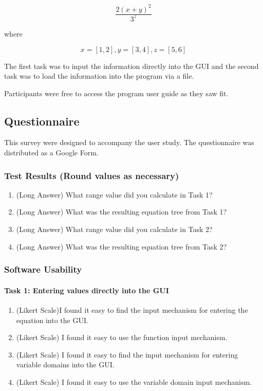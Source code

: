 \documentclass[12pt, titlepage]{article}
\begin{document}
$$\frac{2(x + y)^2}{3^z}$$

where

$$x = [1, 2], y = [3, 4], z = [5, 6]$$

The first task was to input the information directly into the GUI and the 
second task was to load the information into the program via a file.

Participants were free to access the program user guide as they saw fit. 

\subsection{Questionnaire}
This survey were designed to accompany the user study. The questionnaire was 
distributed as a Google Form.

\subsubsection{Test Results (Round values as necessary)}
\begin{enumerate}
	\item (Long Answer) What range value did you calculate in Task 1?
	\item (Long Answer) What was the resulting equation tree from Task 1?
	\item (Long Answer) What range value did you calculate in Task 2?
	\item (Long Answer) What was the resulting equation tree from Task 2?
\end{enumerate}

\subsubsection{Software Usability}
\paragraph{Task 1: Entering values directly into the GUI}
\begin{enumerate}
	\item (Likert Scale)I found it easy to find the input mechanism for 
	entering 
	the equation into the GUI.
	
	\item (Likert Scale) I found it easy to use the function input mechanism.
	
	\item (Likert Scale) I found it easy to find the input mechanism for 
	entering variable domains into the GUI. 
	
	\item (Likert Scale) I found it easy to use the variable domain input 
	mechanism. 
\end{enumerate}
\end{document}
